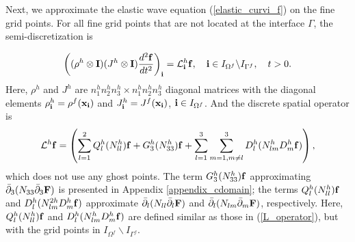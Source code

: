 {Next, we approximate the elastic wave equation (\ref{elastic_curvi_f}) on the fine grid points. For all fine grid points that are not located at the interface $\Gamma$, the semi-discretization  is
{%
\begin{equation}\label{elastic_semi_f}
\left(({\rho}^{h}\otimes{\bf I})(J^h\otimes{\bf I})\frac{d^2{{\bf f}}}{dt^2}\right)_{\bf i} = {\mathcal{L}}^{h}_{\bf i} {{\bf f}},\quad {\bf i}\in I_{\Omega^f}\backslash I_{{\Gamma^f}},\quad t>0.
\end{equation}
Here, $\rho^{h}$ and $J^{h}$ are $n_1^{h}n_2^{h}n_3^{h}\times n_1^{h}n_2^{h}n_3^{h}$ diagonal matrices with the diagonal elements $\rho^h_{\bf i} = \rho^f({\bf x}_{\bf i})$ and $J^h_{\bf i} = J^f({\bf x}_{\bf i})$, ${\bf i}\in I_{\Omega^f}$. And the discrete spatial operator is
\begin{equation}\label{Lf_operator}
{\mathcal{L}}^{h} {{\bf f}} = \left(\sum_{l=1}^2{Q}_l^{h}({N}_{ll}^h){\bf f}+{G}_3^{h}({N}_{33}^h){\bf f}+\sum_{l=1}^3\sum_{m=1,m\neq l}^3{D}_l^{h}({N}_{lm}^{h}{D}_m^{h}{\bf f})\right),
\end{equation}
which does not use any ghost points. The term ${G}_3^{h}(N_{33}^{h}){\bf f}$ approximating $\bar{\partial}_3(N_{33}\bar{\partial}_3 {\bf F})$ is presented in Appendix \ref{appendix_cdomain}; the terms $Q_l^{h}(N_{ll}^{h}){\bf f}$ and $D_{l}^{h}(N_{lm}^{2h}D_m^{h}{\bf f})$ approximate $\bar{\partial}_l(N_{ll}\bar{\partial}_l{\bf F})$ and $\bar{\partial}_l(N_{lm}\bar{\partial}_m {\bf F})$, respectively. Here, ${Q}_l^{h}({N}_{ll}^h){\bf f}$ and ${D}_l^{h}({N}_{lm}^{h}{D}_m^{h}{\bf f})$ are defined similar as those in (\ref{L_operator}), but with the grid points in $I_{\Omega^f}\backslash I_{{\Gamma^f}}$.

}}
